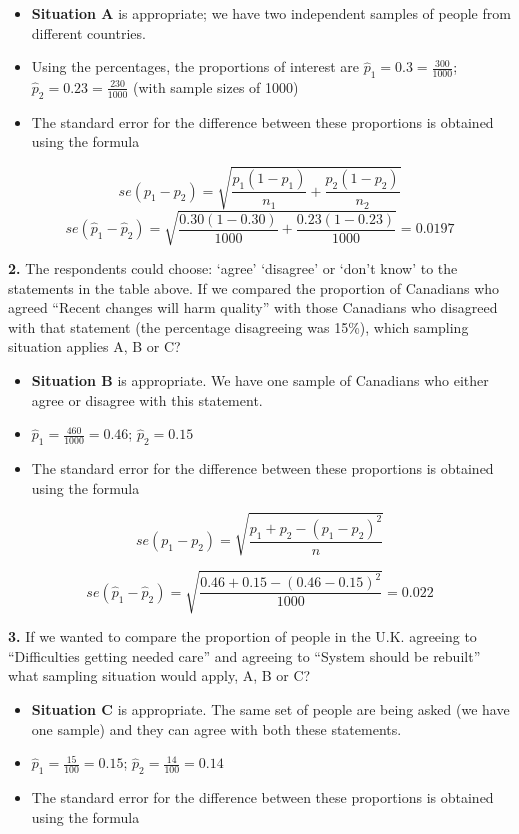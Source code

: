 \documentclass[
  oneside]{krantz}
\begin{document}
\begin{itemize}
\item
  \textbf{Situation A} is appropriate; we have two independent samples of people from different countries.
\item
  Using the percentages, the proportions of interest are \(\hat p_1 = 0.3 = \frac{300}{1000}\); \(\hat p_2 = 0.23 = \frac{230}{1000}\) (with sample sizes of 1000)
\item
  The standard error for the difference between these proportions is obtained using the formula
\end{itemize}

\[se(p_1-p_2) = \sqrt{\frac{p_1(1-p_1)}{n_1}+\frac{p_2(1-p_2)}{n_2}}\]
\[se(\hat p_1-\hat p_2) = \sqrt{\frac{0.30(1-0.30)}{1000}+\frac{0.23(1-0.23)}{1000}}=0.0197\]

\textbf{2.} The respondents could choose: `agree' `disagree' or `don't know' to the statements in the table above. If we compared the proportion of Canadians who agreed ``Recent changes will harm quality'' with those Canadians who disagreed with that statement (the percentage disagreeing was 15\%), which sampling situation applies A, B or C?

\begin{itemize}
\item
  \textbf{Situation B} is appropriate. We have one sample of Canadians who either agree or disagree with this statement.
\item
  \(\hat p_1 = \frac{460}{1000} = 0.46\); \(\hat p_2 = 0.15\)
\item
  The standard error for the difference between these proportions is obtained using the formula
\end{itemize}

\[se(p_1-p_2) =\sqrt{\frac{p_1+ p_2-(p_1-p_2)^2}{n}}\]

\[se(\hat p_1-\hat p_2) =\sqrt{\frac{0.46+ 0.15-(0.46-0.15)^2}{1000}}=0.022\]

\textbf{3.} If we wanted to compare the proportion of people in the U.K. agreeing to ``Difficulties getting needed care'' and agreeing to ``System should be rebuilt'' what sampling situation would apply, A, B or C?

\begin{itemize}
\item
  \textbf{Situation C} is appropriate. The same set of people are being asked (we have one sample) and they can agree with both these statements.
\item
  \(\hat p_1 = \frac{15}{100} = 0.15\); \(\hat p_2 = \frac{14}{100} = 0.14\)
\item
  The standard error for the difference between these proportions is obtained using the formula
\end{itemize}
\end{document}
